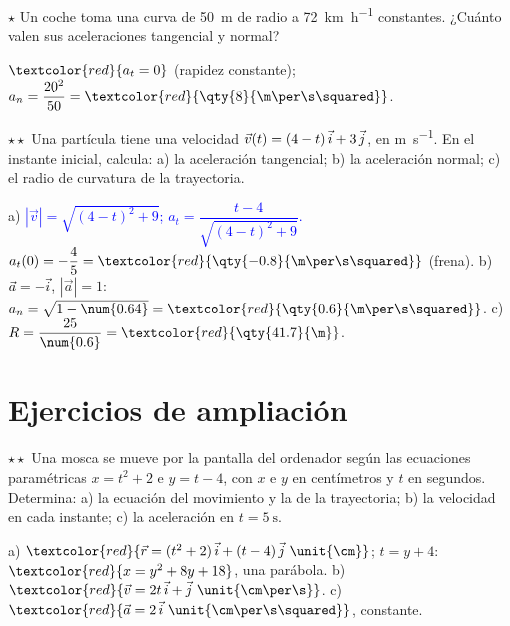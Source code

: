 \begin{exercise}
    \(\star\) Un coche toma una curva de \qty{50}{\m} de radio a \qty{72}{\km\per\hour} constantes. ¿Cuánto valen sus aceleraciones
    tangencial y normal?
    \begin{solu}
        \(\textcolor{red}{a_t = 0}\) (rapidez constante); \(a_n = \dfrac{20^2}{50} = \textcolor{red}{\qty{8}{\m\per\s\squared}}\).
    \end{solu}
\end{exercise}

\begin{exercise}
    \(\star\star\) Una partícula tiene una velocidad \(\vec v(t) = (4 - t)\,\vec{i} + 3\,\vec{j}\), en \unit{\m\per\s}. En el instante
    inicial, calcula: a) la aceleración tangencial; b) la aceleración normal; c) el radio de curvatura de la trayectoria.
    \begin{solu}
        a) \textcolor{blue}{\(|\vec v| = \sqrt{(4 - t)^2 + 9}\); \(a_t = \dfrac{t - 4}{\sqrt{(4 - t)^2 + 9}}\).} \(a_t(0) = -\dfrac{4}{5} =
        \textcolor{red}{\qty{-0.8}{\m\per\s\squared}}\) (frena). b) \(\vec a = -\vec{i}\), \(|\vec a| = 1\): \(a_n = \sqrt{1 - \num{0.64}} =
        \textcolor{red}{\qty{0.6}{\m\per\s\squared}}\). c) \(R = \dfrac{25}{\num{0.6}} = \textcolor{red}{\qty{41.7}{\m}}\).
    \end{solu}
\end{exercise}

\section{Ejercicios de ampliación}\label{sec:ud8-ampliacion}

\begin{exercise}
    \(\star\star\) Una mosca se mueve por la pantalla del ordenador según las ecuaciones paramétricas \(x = t^2 + 2\) e
    \(y = t - 4\), con \(x\) e \(y\) en centímetros y \(t\) en segundos. Determina: a) la ecuación del movimiento y la de la
    trayectoria; b) la velocidad en cada instante; c) la aceleración en \(t = \qty{5}{\s}\).
    \begin{solu}
        a) \(\textcolor{red}{\vec r = (t^2 + 2)\,\ivec + (t - 4)\,\jvec~\unit{\cm}}\); \(t = y + 4\):
        \(\textcolor{red}{x = y^2 + 8y + 18}\), una parábola. b) \(\textcolor{red}{\vec v = 2t\,\ivec + \jvec~\unit{\cm\per\s}}\).
        c) \(\textcolor{red}{\vec a = 2\,\ivec~\unit{\cm\per\s\squared}}\), constante.
    \end{solu}
\end{exercise}

